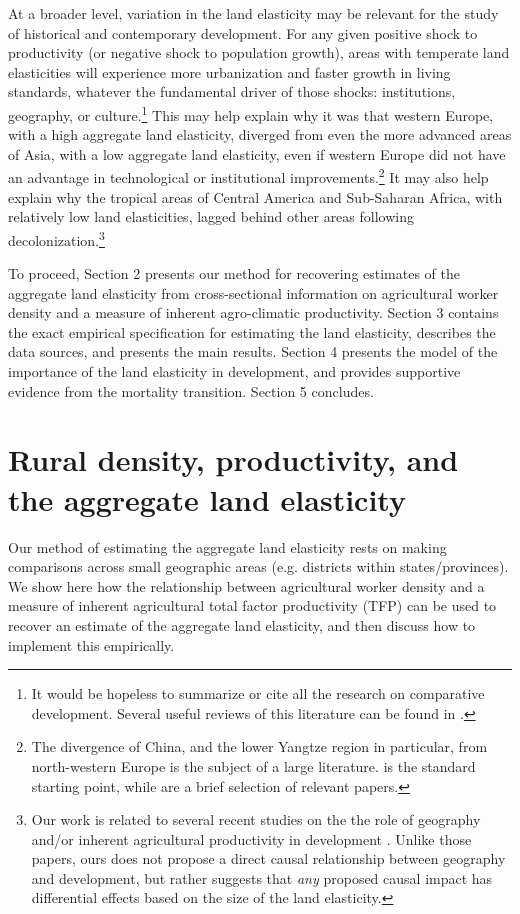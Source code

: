 \documentclass[11pt]{article}
\begin{document}
At a broader level, variation in the land elasticity may be relevant for the study of historical and contemporary development. For any given positive shock to productivity (or negative shock to population growth), areas with temperate land elasticities will experience more urbanization and faster growth in living standards, whatever the fundamental driver of those shocks: institutions, geography, or culture.\footnote{It would be hopeless to summarize or cite all the research on comparative development. Several useful reviews of this literature can be found in \cite{ajr2005handbook,nunn_2009,Galor:2011uq,sw2013,vries2013}.} This may help explain why it was that western Europe, with a high aggregate land elasticity, diverged from even the more advanced areas of Asia, with a low aggregate land elasticity, even if western Europe did not have an advantage in technological or institutional improvements.\footnote{The divergence of China, and the lower Yangtze region in particular, from north-western Europe is the subject of a large literature. \citet{pom2000} is the standard starting point, while \citet{allen11,huang2002,ma2013,lee2002,bg2006} are a brief selection of relevant papers.} It may also help explain why the tropical areas of Central America and Sub-Saharan Africa, with relatively low land elasticities, lagged behind other areas following decolonization.\footnote{Our work is related to several recent studies on the the role of geography and/or inherent agricultural productivity in development \citep{oh2005,ashraf2010dynamics,Nunn2011,Nunn2012,mich2012,agn2013,cook14,cook2014role,fenske2014,alsan2015,ashrafmich2015,dks2015,galorozak2016,litina2016,ads2016,FrankemaPap2017}. Unlike those papers, ours does not propose a direct causal relationship between geography and development, but rather suggests that \textit{any} proposed causal impact has differential effects based on the size of the land elasticity.} 

To proceed, Section 2 presents our method for recovering estimates of the aggregate land elasticity from cross-sectional information on agricultural worker density and a measure of inherent agro-climatic productivity. Section 3 contains the exact empirical specification for estimating the land elasticity, describes the data sources, and presents the main results. Section 4 presents the model of the importance of the land elasticity in development, and provides supportive evidence from the mortality transition. Section 5 concludes.

\section{Rural density, productivity, and the aggregate land elasticity}\label{SEC_agmodel}
Our method of estimating the aggregate land elasticity rests on making comparisons across small geographic areas (e.g. districts within states/provinces). We show here how the relationship between agricultural worker density and a measure of inherent agricultural total factor productivity (TFP) can be used to recover an estimate of the aggregate land elasticity, and then discuss how to implement this empirically.
\end{document}
